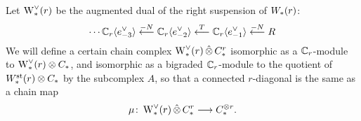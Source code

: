 Let $\operatorname{W}^\vee_{*}(r)$ be the augmented dual of the right suspension of $W_{*}(r)$:
\[
\dotsb
\mathbb{C}_r\langle e_{-3}^\vee\rangle
\overset{-N}{\longleftarrow}
\mathbb{C}_r\langle e_{-2}^\vee\rangle
\overset{T}{\longleftarrow}
\mathbb{C}_r\langle e_{-1}^{\vee}\rangle
\overset{-N}{\longleftarrow}
R
\]
We will define a certain chain complex $\operatorname{W}^\vee_{*}(r)\operatorname{\hat{\otimes}} C^{r}_{*}$ isomorphic as a $\mathbb{C}_r$-module to $\operatorname{W}^\vee_{*}(r)\otimes C_{*}$, and isomorphic as a bigraded $\mathbb{C}_r$-module to the quotient of $W^{\mathrm{st}}_{*}(r)\otimes C_{*}$ by the subcomplex $A$, so that a connected $r$-diagonal is the same as a chain map
\[
\mu\colon \operatorname{W}^\vee_{*}(r)\operatorname{\hat{\otimes}} C^{r}_{*}\longrightarrow C_{*}^{\otimes r}.
\]




